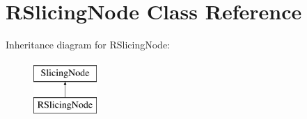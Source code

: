 \hypertarget{class_open_chams_1_1_r_slicing_node}{\section{R\-Slicing\-Node Class Reference}
\label{class_open_chams_1_1_r_slicing_node}
}
Inheritance diagram for R\-Slicing\-Node\-:\begin{figure}[H]
\begin{center}
\leavevmode
\includegraphics[height=2.000000cm]{class_open_chams_1_1_r_slicing_node}
\end{center}
\end{figure}
